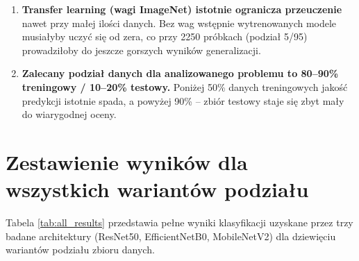 \documentclass[12pt,a4paper]{article}
\begin{document}
\begin{enumerate}
    \item \textbf{Transfer learning (wagi ImageNet) istotnie ogranicza przeuczenie} nawet przy małej ilości danych. Bez wag wstępnie wytrenowanych modele musiałyby uczyć się od zera, co przy 2250 próbkach (podział 5/95) prowadziłoby do jeszcze gorszych wyników generalizacji.

    \item \textbf{Zalecany podział danych dla analizowanego problemu to 80--90\% treningowy / 10--20\% testowy.} Poniżej 50\% danych treningowych jakość predykcji istotnie spada, a powyżej 90\% -- zbiór testowy staje się zbyt mały do wiarygodnej oceny.
\end{enumerate}

\clearpage

\appendix

\section{Zestawienie wyników dla wszystkich wariantów podziału}
\label{ad:additionalmatrixes}

Tabela \ref{tab:all_results} przedstawia pełne wyniki klasyfikacji uzyskane przez trzy badane architektury (ResNet50, EfficientNetB0, MobileNetV2) dla dziewięciu wariantów podziału zbioru danych.
\end{document}
